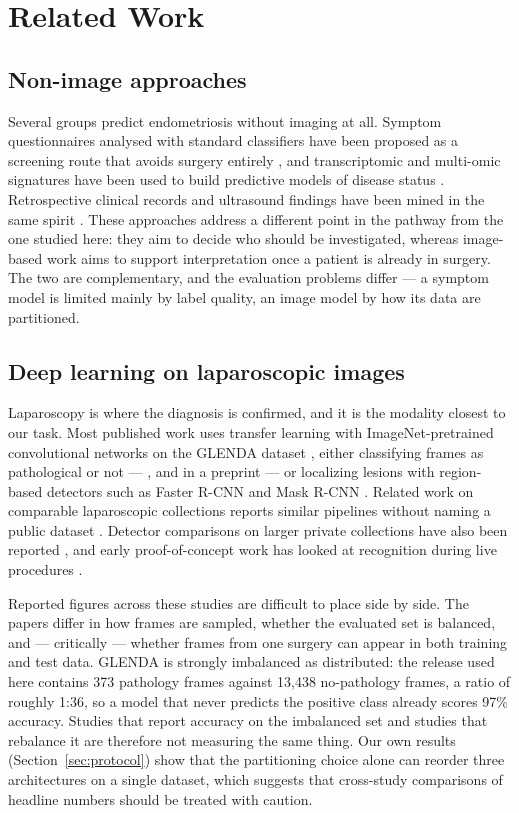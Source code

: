 \documentclass[preprint,12pt]{elsarticle}
\begin{document}
\section{Related Work}
\label{sec:related}

\subsection{Non-image approaches}

Several groups predict endometriosis without imaging at all. Symptom questionnaires analysed with standard classifiers have been proposed as a screening route that avoids surgery entirely \cite{ref_d1,ref_d2}, and transcriptomic and multi-omic signatures have been used to build predictive models of disease status \cite{ref_m3,ref_m4}. Retrospective clinical records and ultrasound findings have been mined in the same spirit \cite{ref_m1,ref_m2}. These approaches address a different point in the pathway from the one studied here: they aim to decide who should be investigated, whereas image-based work aims to support interpretation once a patient is already in surgery. The two are complementary, and the evaluation problems differ --- a symptom model is limited mainly by label quality, an image model by how its data are partitioned.

\subsection{Deep learning on laparoscopic images}

Laparoscopy is where the diagnosis is confirmed, and it is the modality closest to our task. Most published work uses transfer learning with ImageNet-pretrained convolutional networks on the GLENDA dataset \cite{ref_a4}, either classifying frames as pathological or not --- \cite{ref_a2}, and \cite{ref_a5} in a preprint --- or localizing lesions with region-based detectors such as Faster R-CNN and Mask R-CNN \cite{ref_a3}. Related work on comparable laparoscopic collections reports similar pipelines without naming a public dataset \cite{ref_a7}. Detector comparisons on larger private collections have also been reported \cite{ref_a6}, and early proof-of-concept work has looked at recognition during live procedures \cite{ref_a10}.

Reported figures across these studies are difficult to place side by side. The papers differ in how frames are sampled, whether the evaluated set is balanced, and --- critically --- whether frames from one surgery can appear in both training and test data. GLENDA is strongly imbalanced as distributed: the release used here contains 373 pathology frames against 13,438 no-pathology frames, a ratio of roughly 1:36, so a model that never predicts the positive class already scores 97\% accuracy. Studies that report accuracy on the imbalanced set and studies that rebalance it are therefore not measuring the same thing. Our own results (Section~\ref{sec:protocol}) show that the partitioning choice alone can reorder three architectures on a single dataset, which suggests that cross-study comparisons of headline numbers should be treated with caution.
\end{document}
